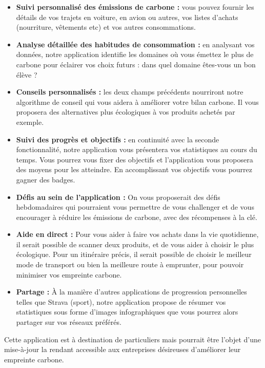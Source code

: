 \documentclass{article}
\begin{document}
\begin{itemize}
    \item \textbf{Suivi personnalisé des émissions de carbone :}  vous pouvez fournir les détails de vos trajets en voiture, en avion ou autres, vos listes d'achats (nourriture, vêtements etc) et vos autres consommations.
    \item \textbf{Analyse détaillée des habitudes de consommation :} en analysant vos données, notre application identifie les domaines où vous émettez le plus de carbone pour éclairer vos choix futurs : dans quel domaine êtes-vous un bon élève ?
    \item \textbf{Conseils personnalisés :} les deux champs précédents nourriront notre algorithme de conseil qui vous aidera à améliorer votre bilan carbone. Il vous proposera des alternatives plus écologiques à vos produits achetés par exemple.
    \item \textbf{Suivi des progrès et objectifs :} en continuité avec la seconde fonctionnalité, notre application vous présentera vos statistiques au cours du temps. Vous pourrez vous fixer des objectifs et l'application vous proposera des moyens pour les atteindre. En accomplissant vos objectifs vous pourrez gagner des badges.
    \item \textbf{Défis au sein de l'application :} On vous proposerait des défis hebdomadaires qui pourraient vous permettre de vous challenger et de vous encourager à réduire les émissions de carbone, avec des récompenses à la clé.
    \item \textbf{Aide en direct :} Pour vous aider à faire vos achats dans la vie quotidienne, il serait possible de scanner deux produits, et de vous aider à choisir le plus écologique. Pour un itinéraire précis, il serait possible de choisir le meilleur mode de transport ou bien la meilleure route à emprunter, pour pouvoir minimiser vos empreinte carbone.
    \item \textbf{Partage :} À la manière d'autres applications de progression personnelles telles que Strava (sport), notre application propose de résumer vos statistiques sous forme d'images infographiques que vous pourrez alors partager sur vos réseaux préférés.
\end{itemize}

Cette application est à destination de particuliers mais pourrait être l'objet d'une mise-à-jour la rendant accessible aux entreprises désireuses d'améliorer leur empreinte carbone.
\end{document}
